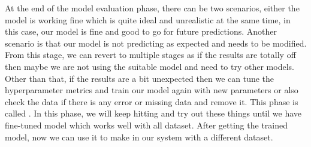\newline
\par
At the end of the model evaluation phase, there can be two scenarios, either the model is working fine which is quite ideal and unrealistic at the same time, in this case, our model is fine and good to go for future predictions. Another scenario is that our model is not predicting as expected and needs to be modified. From this stage, we can revert to multiple stages as if the results are totally off then maybe we are not using the suitable model and need to try other models. Other than that, if the results are a bit unexpected then we can tune the hyperparameter metrics and train our model again with new parameters or also check the data if there is any error or missing data and remove it. This phase is called . In this phase, we will keep hitting and try out these things until we have fine-tuned model which works well with all dataset. After getting the trained model, now we can use it to make  in our system with a different dataset.
